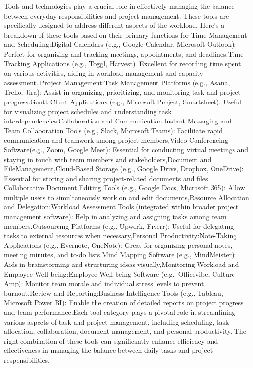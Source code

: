 \documentclass{chart}
\begin{document}
\hspace{1cm}Tools and technologies play a crucial role in effectively managing the balance between everyday responsibilities and project management. These tools are specifically designed to address different aspects of the workload. Here's a breakdown of these tools based on their primary functions  for Time Management and Scheduling:Digital Calendars (e.g., Google Calendar, Microsoft Outlook): Perfect for organizing and tracking meetings, appointments, and deadlines.Time Tracking Applications (e.g., Toggl, Harvest): Excellent for recording time spent on various activities, aiding in workload management and capacity assessment.,Project Management:Task Management Platforms (e.g., Asana, Trello, Jira): Assist in organizing, prioritizing, and monitoring task and project progress.Gantt Chart Applications (e.g., Microsoft Project, Smartsheet): Useful for visualizing project schedules and understanding task interdependencies.Collaboration and Communication:Instant Messaging and Team Collaboration Tools (e.g., Slack, Microsoft Teams): Facilitate rapid communication and teamwork among project members,Video Conferencing Software(e.g., Zoom, Google Meet): Essential for conducting virtual meetings and staying in touch with team members and stakeholders,Document and FileManagement,Cloud-Based Storage (e.g., Google Drive, Dropbox, OneDrive): Essential for storing and sharing project-related documents and files.\\\hspace{1cm}Collaborative Document Editing Tools (e.g., Google Docs, Microsoft 365): Allow multiple users to simultaneously work on and edit documents,Resource Allocation and Delegation:Workload Assessment Tools (integrated within broader project management software): Help in analyzing and assigning tasks among team members.Outsourcing Platforms (e.g., Upwork, Fiverr): Useful for delegating tasks to external resources when necessary,Personal Productivity:Note-Taking Applications (e.g., Evernote, OneNote): Great for organizing personal notes, meeting minutes, and to-do lists.Mind Mapping Software (e.g., MindMeister): Aids in brainstorming and structuring ideas visually,Monitoring Workload and Employee Well-being:Employee Well-being Software (e.g., Officevibe, Culture Amp): Monitor team morale and individual stress levels to prevent burnout,Review and Reporting:Business Intelligence Tools (e.g., Tableau, Microsoft Power BI): Enable the creation of detailed reports on project progress and team performance.Each tool category plays a pivotal role in streamlining various aspects of task and project management, including scheduling, task allocation, collaboration, document management, and personal productivity. The right combination of these tools can significantly enhance efficiency and effectiveness in managing the balance between daily tasks and project responsibilities.
\newpage
 \vspace*{0.5cm}
\end{document}
